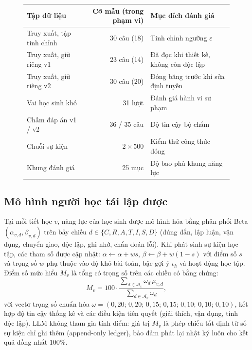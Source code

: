 \documentclass[10pt,a4paper,twocolumn]{article}
\begin{document}
\begin{figure}[t]
\begin{minipage}[t]{0.47\textwidth}
\footnotesize
\begin{tabular}{@{}>{\raggedright\arraybackslash}p{2.4cm}r>{\raggedright\arraybackslash}p{2.2cm}@{}}
\toprule
Tập dữ liệu & Cỡ mẫu (trong phạm vi) & Mục đích đánh giá \\
\midrule
Truy xuất, tập tinh chỉnh & 30 câu (18) & Tinh chỉnh ngưỡng $\varepsilon$ \\
Truy xuất, giữ riêng v1 & 23 câu (14) & Đã đọc khi thiết kế, không còn độc lập \\
Truy xuất, giữ riêng v2 & 30 câu (20) & Đóng băng trước khi sửa định tuyến \\
Vai học sinh khó & 31 lượt & Đánh giá hành vi sư phạm \\
Chấm đáp án v1 / v2 & 36 / 35 câu & Độ tin cậy bộ chấm \\
Chuỗi sự kiện & $2\times500$ & Kiểm thử công thức đóng \\
Khung đánh giá & 25 mục & Độ bao phủ khung năng lực \\
\bottomrule
\end{tabular}
\end{minipage}
\end{figure}

\subsection{Mô hình người học tái lập được}
Tại mỗi tiết học $v$, năng lực của học sinh được mô hình hóa bằng phân phối Beta$(\alpha_{v,d},\beta_{v,d})$ trên bảy chiều $d\in\{C,R,A,T,I,S,D\}$ (đúng đắn, lập luận, vận dụng, chuyển giao, độc lập, ghi nhớ, chẩn đoán lỗi). Khi phát sinh sự kiện học tập, các tham số được cập nhật: $\alpha\leftarrow\alpha+ws$, $\beta\leftarrow\beta+w(1-s)$ với điểm số $s$ và trọng số $w$ phụ thuộc vào độ khó bài toán, bậc gợi ý $\iota_h$ và hoạt động học tập. Điểm số mức hiểu $M_v$ là tổng có trọng số trên các chiều có bằng chứng:
\begin{equation}
M_v=100\cdot\frac{\sum_{d\in\mathcal{A}_v}\omega_d\,\mu_{v,d}}{\sum_{d\in\mathcal{A}_v}\omega_d},
\end{equation}
với vectơ trọng số chuẩn hóa $\omega=(0{,}20;\allowbreak\,0{,}20;\allowbreak\,0{,}15;\allowbreak\,0{,}15;\allowbreak\,0{,}10;\allowbreak\,0{,}10;\allowbreak\,0{,}10)$, kết hợp độ tin cậy thống kê và các điều kiện tiên quyết (giải thích, vận dụng, tính độc lập). LLM không tham gia tính điểm: giá trị $M_v$ là phép chiếu tất định từ sổ sự kiện chỉ ghi thêm (append-only ledger), bảo đảm phát lại nhật ký luôn cho kết quả đồng nhất 100\%.
\end{document}
